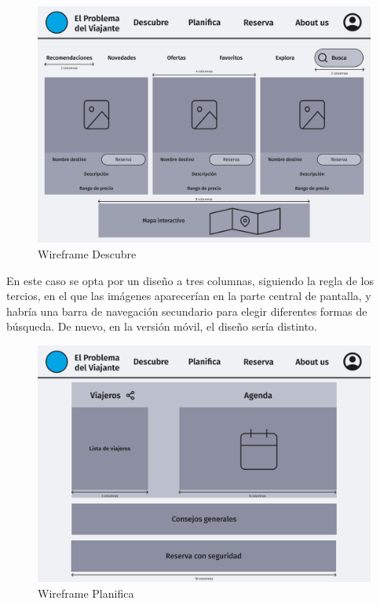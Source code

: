 \documentclass[11pt, a4paper]{book}
\begin{document}
	
	\begin{figure} [H]
		\centering
		\includegraphics[width=\textwidth]{wireframe-descubre.png}
		\caption{Wireframe Descubre}
	\end{figure}

	En este caso se opta por un diseño a tres columnas, siguiendo la regla de los tercios, en el que las imágenes aparecerían en la parte central de pantalla, y habría una barra de navegación secundario para elegir diferentes formas de búsqueda. De nuevo, en la versión móvil, el diseño sería distinto.
	
	\newpage

	\begin{figure} [H]
		\centering
		\includegraphics[width=\textwidth]{wireframe-planifica.png}
		\caption{Wireframe Planifica}
	\end{figure}
\end{document}
